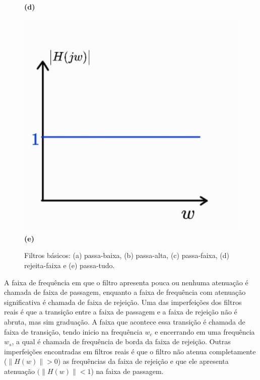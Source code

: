 \begin{figure}[h!]
\begin{minipage}[b]{0.32\linewidth}
        \centering
        \\ \textbf{(d)}
    \end{minipage}
    \begin{minipage}[b]{0.32\linewidth}     
        \includegraphics[width=\linewidth]{figuras/passa_tudo.png}
        \centering
        \\ \textbf{(e)}
    \end{minipage}
    \caption{Filtros básicos: (a) passa-baixa, (b) passa-alta, (c) passa-faixa, (d) rejeita-faixa e (e) passa-tudo.}
    \label{fig:filtros_basicos}
\end{figure}

A faixa de frequência em que o filtro apresenta pouca ou nenhuma atenuação é chamada de faixa de passagem, enquanto a faixa de frequência com atenuação significativa é chamada de faixa de rejeição. Uma das imperfeições dos filtros reais é que a transição entre a faixa de passagem e a faixa de rejeição não é abruta, mas sim graduação. A faixa que acontece essa transição é chamada de faixa de transição, tendo inicio na frequência $w_c$ e encerrando em uma frequência $w_s$, a qual é chamada de frequência de borda da faixa de rejeição. Outras imperfeições encontradas em filtros reais é que o filtro não atenua completamente ($\|H(w)\| > 0$) as frequências da faixa de rejeição e que ele apresenta atenuação $(\|H(w)\| < 1$) na faixa de passagem.

